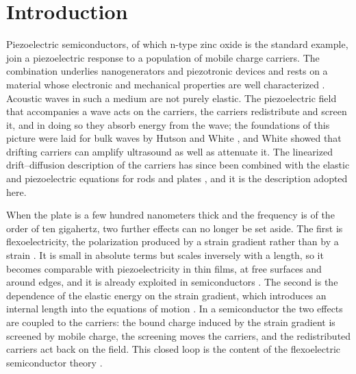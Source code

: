 \section{Introduction}
\label{sec:intro}

Piezoelectric semiconductors, of which n-type zinc oxide is the standard
example, join a piezoelectric response to a population of mobile charge
carriers.  The combination underlies nanogenerators and piezotronic devices
\cite{wang2006nanogenerators,wang2012progress} and rests on a material whose
electronic and mechanical properties are well characterized
\cite{ozgur2005zno}.  Acoustic waves in such a medium are not purely elastic.
The piezoelectric field that accompanies a wave acts on the carriers, the carriers redistribute and screen it, and in doing so they absorb energy from the wave; the foundations of this picture were laid for bulk waves by Hutson and
White \cite{hutson1962elastic}, and White \cite{white1962amplification} showed
that drifting carriers can amplify ultrasound as well as attenuate it.  The
linearized drift--diffusion description of the carriers has since been combined
with the elastic and piezoelectric equations for rods \cite{zhang2016extensional}
and plates \cite{zhang2025pscplate}, and it is the description adopted here.

When the plate is a few hundred nanometers thick and the frequency is of the
order of ten gigahertz, two further effects can no longer be set aside.  The
first is flexoelectricity, the polarization produced by a strain gradient rather than by a strain \cite{tagantsev1986piezo,majdoub2008enhanced,
yudin2013fundamentals,zubko2013flexoelectric,shen2010theory,deng2020impact}.  It is small in absolute terms but scales inversely with a length, so it
becomes comparable with piezoelectricity in thin films, at free surfaces and
around edges, and it is already exploited in semiconductors
\cite{narvaez2016enhanced,bhaskar2016flexoelectric,wang2020flexoelectronics}.
The second is the dependence of the elastic energy on the strain gradient, which
introduces an internal length into the equations of motion
\cite{mindlin1964micro,mindlin1968first}.  In a semiconductor the two effects are
coupled to the carriers: the bound charge induced by the strain gradient is
screened by mobile charge, the screening moves the carriers, and the redistributed carriers act back on the field.  This closed loop is the content of the
flexoelectric semiconductor theory
\cite{qu2020mobile,qu2022thermal,qu2022bending}.

